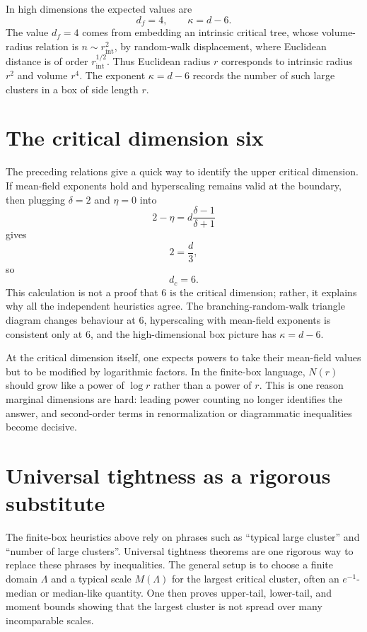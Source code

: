 \documentclass[11pt,reqno]{book}
\numberwithin{equation}{chapter}
\theoremstyle{plain}
\theoremstyle{definition}
\theoremstyle{remark}
\newcommand{\1}{\mathbf 1}
\begin{document}
In high dimensions the expected values are
\[
  d_f=4,
  \qquad
  \kappa=d-6.
\]
The value $d_f=4$ comes from embedding an intrinsic critical tree, whose volume-radius relation is $n\sim r_{\mathrm{int}}^2$, by random-walk displacement, where Euclidean distance is of order $r_{\mathrm{int}}^{1/2}$. Thus Euclidean radius $r$ corresponds to intrinsic radius $r^2$ and volume $r^4$. The exponent $\kappa=d-6$ records the number of such large clusters in a box of side length $r$.

\section{The critical dimension six}

The preceding relations give a quick way to identify the upper critical dimension. If mean-field exponents hold and hyperscaling remains valid at the boundary, then plugging $\delta=2$ and $\eta=0$ into
\[
  2-\eta=d\frac{\delta-1}{\delta+1}
\]
gives
\[
  2=\frac d3,
\]
so
\[
  d_c=6.
\]
This calculation is not a proof that $6$ is the critical dimension; rather, it explains why all the independent heuristics agree. The branching-random-walk triangle diagram changes behaviour at $6$, hyperscaling with mean-field exponents is consistent only at $6$, and the high-dimensional box picture has $\kappa=d-6$.

At the critical dimension itself, one expects powers to take their mean-field values but to be modified by logarithmic factors. In the finite-box language, $N(r)$ should grow like a power of $\log r$ rather than a power of $r$. This is one reason marginal dimensions are hard: leading power counting no longer identifies the answer, and second-order terms in renormalization or diagrammatic inequalities become decisive.

\section{Universal tightness as a rigorous substitute}

The finite-box heuristics above rely on phrases such as ``typical large cluster'' and ``number of large clusters''. Universal tightness theorems are one rigorous way to replace these phrases by inequalities. The general setup is to choose a finite domain $\Lambda$ and a typical scale $M(\Lambda)$ for the largest critical cluster, often an $e^{-1}$-median or median-like quantity. One then proves upper-tail, lower-tail, and moment bounds showing that the largest cluster is not spread over many incomparable scales.
\end{document}
